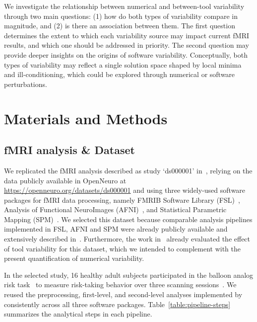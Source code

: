 \documentclass[11pt,onecolumn]{article}
\begin{document}
We investigate the relationship between numerical and between-tool
variability through two main questions: (1) how do both types of
variability compare in magnitude, and (2) is there an association between
them. The first question determines the extent to which each variability
source may impact current fMRI results, and which one should be addressed
in priority. The second question may provide deeper insights on the origins
of software variability. Conceptually, both types of variability may
reflect a single solution space shaped by local minima and
ill-conditioning, which could be explored through numerical or software
perturbations.


\section{Materials and Methods}

\subsection{fMRI analysis \& Dataset}

We replicated the fMRI analysis described as study `ds000001'
in~\cite{schonberg2012decreasing}, relying on the data publicly available
in OpenNeuro at \url{https://openneuro.org/datasets/ds000001} and using
three widely-used software packages for fMRI data processing, namely FMRIB
Software Library (FSL)~\cite{jenkinson2012fsl}, Analysis of Functional
NeuroImages (AFNI)~\cite{cox1996afni}, and Statistical Parametric
Mapping (SPM)~\cite{penny2011statistical}. We selected this dataset because
comparable analysis pipelines implemented in FSL, AFNI and SPM were already 
publicly available and extensively described in~\cite{bowring2019exploring}.
Furthermore, the work in~\cite{bowring2019exploring} already evaluated the
effect of tool variability for this dataset, which we intended to
complement with the present quantification of numerical variability.

In the selected study, 16 healthy adult subjects participated in the
balloon analog risk task~\cite{lejuez2002evaluation} to measure risk-taking
behavior over three scanning sessions~\cite{schonberg2012decreasing}. We
reused the preprocessing, first-level, and second-level analyses
implemented by~\cite{bowring2019exploring} consistently across all three
software packages. Table~\ref{table:pipeline-steps} summarizes the analytical steps in each
pipeline.
\end{document}
